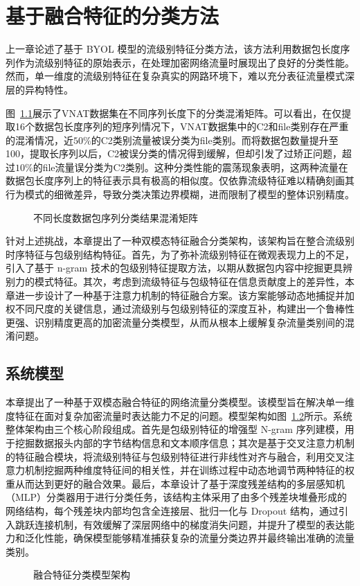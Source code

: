 
\chapter{基于融合特征的分类方法}

上一章论述了基于 BYOL 模型的流级别特征分类方法，该方法利用数据包长度序列作为流级别特征的原始表示，在处理加密网络流量时展现出了良好的分类性能。然而，单一维度的流级别特征在复杂真实的网路环境下，难以充分表征流量模式深层的异构特性。

图~\ref{fig:confusion}展示了VNAT数据集在不同序列长度下的分类混淆矩阵。可以看出，在仅提取16个数据包长度序列的短序列情况下，VNAT数据集中的C2和file类别存在严重的混淆情况，近$50\%$的C2类别流量被误分类为file类别。而将数据包数量提升至100，提取长序列以后，C2被误分类的情况得到缓解，但却引发了过矫正问题，超过$10\%$的file流量误分类为C2类别。这种分类性能的震荡现象表明，这两种流量在数据包长度序列上的特征表示具有极高的相似度。仅依靠流级特征难以精确刻画其行为模式的细微差异，导致分类决策边界模糊，进而限制了模型的整体识别精度。

\begin{figure}[ht]
  \centering
  \caption{不同长度数据包序列分类结果混淆矩阵}
  \label{fig:confusion}
\end{figure}

针对上述挑战，本章提出了一种双模态特征融合分类架构，该架构旨在整合流级别时序特征与包级别结构特征。首先，为了弥补流级别特征在微观表现力上的不足，引入了基于 n-gram 技术的包级别特征提取方法，以期从数据包内容中挖掘更具辨别力的模式特征。其次，考虑到流级特征与包级特征在信息贡献度上的差异性，本章进一步设计了一种基于注意力机制的特征融合方案。该方案能够动态地捕捉并加权不同尺度的关键信息，通过流级别与包级别特征的深度互补，构建出一个鲁棒性更强、识别精度更高的加密流量分类模型，从而从根本上缓解复杂流量类别间的混淆问题。

\section{系统模型}
本章提出了一种基于双模态融合特征的网络流量分类模型。该模型旨在解决单一维度特征在面对复杂加密流量时表达能力不足的问题。模型架构如图~\ref{fig:fusionnetwork}所示。系统整体架构由三个核心阶段组成。首先是包级别特征的增强型 N-gram 序列建模，用于挖掘数据报头内部的字节结构信息和文本顺序信息；其次是基于交叉注意力机制的特征融合模块，将流级别特征与包级别特征进行非线性对齐与融合，利用交叉注意力机制挖掘两种维度特征间的相关性，并在训练过程中动态地调节两种特征的权重从而达到更好的融合效果。最后，本章设计了基于深度残差结构的多层感知机（MLP）分类器用于进行分类任务，该结构主体采用了由多个残差块堆叠形成的网络结构，每个残差块内部均包含全连接层、批归一化与 Dropout 结构，通过引入跳跃连接机制，有效缓解了深层网络中的梯度消失问题，并提升了模型的表达能力和泛化性能，确保模型能够精准捕获复杂的流量分类边界并最终输出准确的流量类别。
\begin{figure}[ht]
  \centering
  \caption{融合特征分类模型架构}
  \label{fig:fusionnetwork}
\end{figure}

